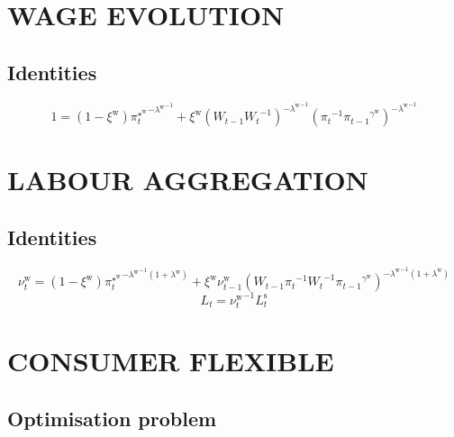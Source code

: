 \section{WAGE EVOLUTION}

\subsection{Identities}

\begin{equation}
1 = \left(1 - \xi^{\mathrm{w}}\right) {{\pi^{\star^{\mathrm{w}}}_{t}}^{-{\lambda^{\mathrm{w}}}^{-1}}} + {\xi^{\mathrm{w}}} {\left({W_{t-1}} {W_{t}}^{-1}\right)^{-{\lambda^{\mathrm{w}}}^{-1}}} {\left({\pi_{t}}^{-1} {{\pi_{t-1}}^{\gamma^{\mathrm{w}}}}\right)^{-{\lambda^{\mathrm{w}}}^{-1}}}
\end{equation}




\section{LABOUR AGGREGATION}

\subsection{Identities}

\begin{equation}
\nu^{\mathrm{w}}_{t} = \left(1 - \xi^{\mathrm{w}}\right) {{\pi^{\star^{\mathrm{w}}}_{t}}^{-{\lambda^{\mathrm{w}}}^{-1} \left(1 + \lambda^{\mathrm{w}}\right)}} + {\xi^{\mathrm{w}}} {\nu^{\mathrm{w}}_{t-1}} {\left({W_{t-1}} {\pi_{t}}^{-1} {W_{t}}^{-1} {{\pi_{t-1}}^{\gamma^{\mathrm{w}}}}\right)^{-{\lambda^{\mathrm{w}}}^{-1} \left(1 + \lambda^{\mathrm{w}}\right)}}
\end{equation}
\begin{equation}
L_{t} = {\nu^{\mathrm{w}}_{t}}^{-1} {L^{\mathrm{s}}_{t}}
\end{equation}




\section{CONSUMER FLEXIBLE}

\subsection{Optimisation problem}

